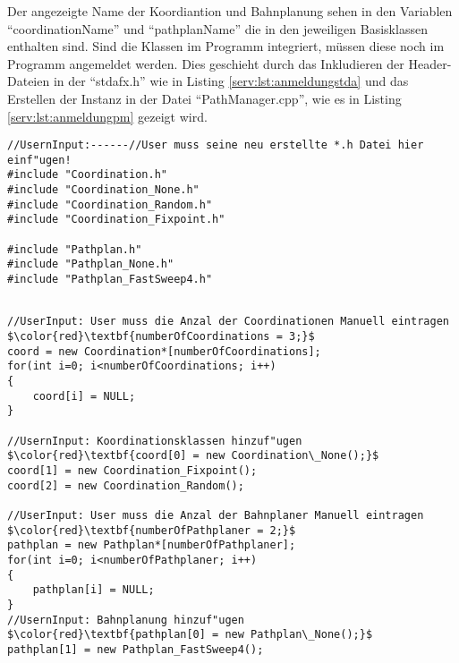 Der angezeigte Name der Koordiantion und Bahnplanung sehen in den Variablen "`coordinationName"' und "`pathplanName"' die in den jeweiligen Basisklassen enthalten sind. Sind die Klassen im Programm integriert, müssen diese noch im Programm angemeldet werden. Dies geschieht durch das Inkludieren der Header-Dateien in der "`stdafx.h"' wie in Listing \ref{serv:lst:anmeldungstda} und das Erstellen der Instanz in der Datei "`PathManager.cpp"', wie es in Listing \ref{serv:lst:anmeldungpm} gezeigt wird.

\begin{lstlisting}[frame=tb,captionpos=b,caption=Anmeldung der Klassen in stdafx.h., label=serv:lst:anmeldungstda]
//UsernInput:------//User muss seine neu erstellte *.h Datei hier einf"ugen!                                    
#include "Coordination.h"
#include "Coordination_None.h"
#include "Coordination_Random.h"
#include "Coordination_Fixpoint.h"

#include "Pathplan.h"
#include "Pathplan_None.h"
#include "Pathplan_FastSweep4.h"
\end{lstlisting}

\begin{lstlisting}[frame=tb,mathescape=true,captionpos=b,caption=Anmeldung der Klassen in PathManager.cpp., label=serv:lst:anmeldungpm]

//UserInput: User muss die Anzal der Coordinationen Manuell eintragen                                          
$\color{red}\textbf{numberOfCoordinations = 3;}$
coord = new Coordination*[numberOfCoordinations];
for(int i=0; i<numberOfCoordinations; i++)
{
    coord[i] = NULL;
}

//UsernInput: Koordinationsklassen hinzuf"ugen                
$\color{red}\textbf{coord[0] = new Coordination\_None();}$
coord[1] = new Coordination_Fixpoint();
coord[2] = new Coordination_Random();  

//UserInput: User muss die Anzal der Bahnplaner Manuell eintragen                                          
$\color{red}\textbf{numberOfPathplaner = 2;}$
pathplan = new Pathplan*[numberOfPathplaner];
for(int i=0; i<numberOfPathplaner; i++)
{
    pathplan[i] = NULL;
}
//UsernInput: Bahnplanung hinzuf"ugen
$\color{red}\textbf{pathplan[0] = new Pathplan\_None();}$
pathplan[1] = new Pathplan_FastSweep4();

\end{lstlisting}
